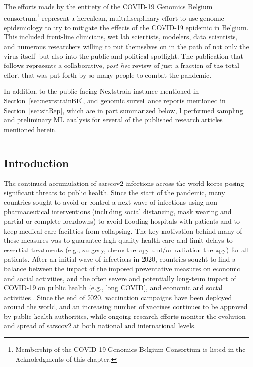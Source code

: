 The efforts made by the entirety of the COVID-19 Genomics Belgium consortium\footnote{Membership of the COVID-19 Genomics Belgium Consortium is listed in the Acknoledgments of this chapter.} represent a herculean, multidisciplinary effort to use genomic epidemiology to try to mitigate the effects of the COVID-19 epidemic in Belgium.
This included front-line clinicians, wet lab scientists, modelers, data scientists, and numerous researchers willing to put themselves on in the path of not only the virus itself, but also into the public and political spotlight.
The publication that follows represents a collaborative, \textit{post hoc} review of just a fraction of the total effort that was put forth by so many people to combat the pandemic.

In addition to the public-facing Nextstrain instance mentioned in Section~\ref{sec:nextstrainBE}, and genomic surveillance reports mentioned in Section~\ref{sec:sitRep}, which are in part summarized below, I performed sampling and preliminary ML analysis for several of the published research articles mentioned herein.
\vspace*{12pt}
\hrule
\onehalfspacing

\subsection{Introduction}
The continued accumulation of \gls{sarscov2} infections across the world keeps posing significant threats to public health.
Since the start of the pandemic, many countries sought to avoid or control a next wave of infections using non-pharmaceutical interventions (including social distancing, mask wearing and partial or complete lockdowns) to avoid flooding hospitals with patients and to keep medical care facilities from collapsing.
The key motivation behind many of these measures was to guarantee high-quality health care and limit delays to essential treatments (e.g., surgery, chemotherapy and/or radiation therapy) for all patients.
After an initial wave of infections in 2020, countries sought to find a balance between the impact of the imposed preventative measures on economic and social activities, and the often severe and potentially long-term impact of COVID-19 on public health (e.g., long COVID), and economic and social activities \citep{zivin2020spread}.
Since the end of 2020, vaccination campaigns have been deployed around the world, and an increasing number of vaccines continues to be approved by public health authorities, while ongoing research efforts monitor the evolution and spread of \gls{sarscov2} at both national and international levels.

